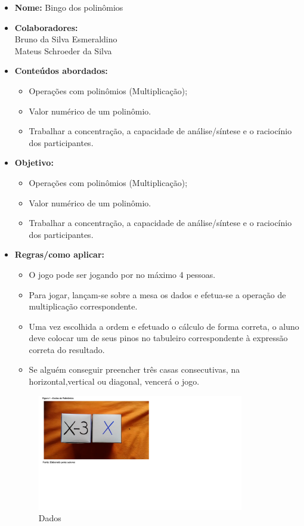 \documentclass[english,ngerman,parskip=half]{scrartcl}
\begin{document}
\begin{itemize}

    \item \textbf{Nome:} Bingo dos polinômios
    \item \textbf{Colaboradores:} \\
        Bruno da Silva Esmeraldino
        \\
        Mateus Schroeder da Silva
    \item \textbf{Conteúdos abordados:}
        \begin{itemize}
            \item Operações com polinômios (Multiplicação);
            \item Valor numérico de um polinômio.
            \item Trabalhar a concentração, a capacidade de análise/síntese e o raciocínio dos participantes.
        \end{itemize}
    \item \textbf{Objetivo:}
        \begin{itemize} 
            \item Operações com polinômios (Multiplicação);
            \item Valor numérico de um polinômio.
            \item Trabalhar a concentração, a capacidade de análise/síntese e o raciocínio dos participantes.
        \end{itemize} 
    \item \textbf{Regras/como aplicar:} 
            \begin{itemize}
                \item O jogo pode ser jogando por no máximo 4 pessoas. 
                \item Para jogar, lançam-se sobre a mesa os  dados e efetua-se a operação de multiplicação correspondente.
                \item Uma vez escolhida a ordem e efetuado o cálculo de forma correta, o aluno deve colocar um de seus pinos no tabuleiro correspondente à expressão correta do resultado.
                \item Se alguém conseguir preencher três casas consecutivas, na horizontal,vertical ou diagonal, vencerá o jogo. 
            \end{itemize}

        \begin{figure}[ht!]
            \centering
            \includegraphics[width=90mm]{./images/dados.png}
            \caption{Dados\label{Dados}}
        \end{figure}


\end{itemize}
\end{document}
